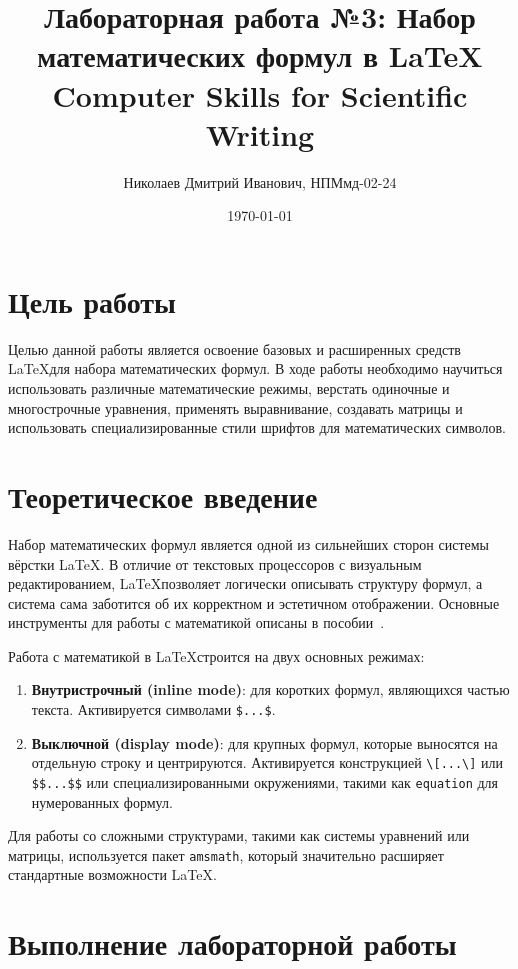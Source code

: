 \documentclass[a4paper, 12pt]{article}
\author{Николаев Дмитрий Иванович, НПМмд-02-24}
\title{Лабораторная работа №3: Набор математических формул в \LaTeX \\ Computer Skills for Scientific Writing}
\date{\today}
\begin{document}
  \maketitle
  \tableofcontents
  \pagebreak

  \listoffigures
  \lstlistoflistings
  \pagebreak

\section{Цель работы}
Целью данной работы является освоение базовых и расширенных средств \LaTeX для набора математических формул. В ходе работы необходимо научиться использовать различные математические режимы, верстать одиночные и многострочные уравнения, применять выравнивание, создавать матрицы и использовать специализированные стили шрифтов для математических символов.

\section{Теоретическое введение}
Набор математических формул является одной из сильнейших сторон системы вёрстки \LaTeX. В отличие от текстовых процессоров с визуальным редактированием, \LaTeX позволяет логически описывать структуру формул, а система сама заботится об их корректном и эстетичном отображении. Основные инструменты для работы с математикой описаны в пособии~\cite{lab}.

Работа с математикой в \LaTeX строится на двух основных режимах:
\begin{enumerate}
    \item \textbf{Внутристрочный (inline mode)}: для коротких формул, являющихся частью текста. Активируется символами \texttt{\$...\$}.
    \item \textbf{Выключной (display mode)}: для крупных формул, которые выносятся на отдельную строку и центрируются. Активируется конструкцией \texttt{\backslash[...\backslash]} или \texttt{\$\$...\$\$} или специализированными окружениями, такими как \texttt{equation} для нумерованных формул.
\end{enumerate}
Для работы со сложными структурами, такими как системы уравнений или матрицы, используется пакет \texttt{amsmath}, который значительно расширяет стандартные возможности \LaTeX.

\section{Выполнение лабораторной работы}
\end{document}
